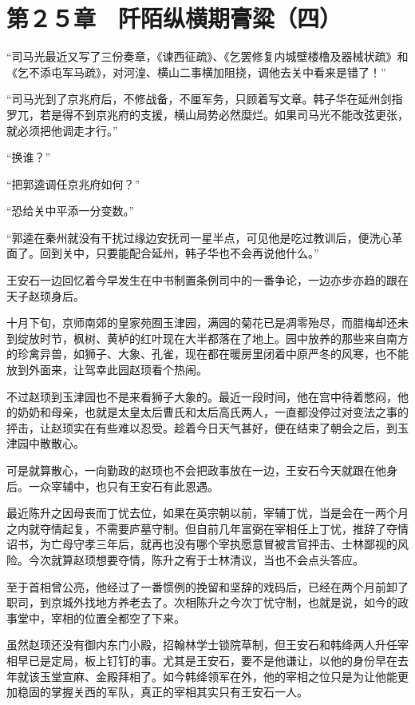 \section{第２５章　阡陌纵横期膏粱（四）}

“司马光最近又写了三份奏章，《谏西征疏》、《乞罢修复内城壁楼橹及器械状疏》和《乞不添屯军马疏》，对河湟、横山二事横加阻挠，调他去关中看来是错了！”

“司马光到了京兆府后，不修战备，不厘军务，只顾着写文章。韩子华在延州剑指罗兀，若是得不到京兆府的支援，横山局势必然糜烂。如果司马光不能改弦更张，就必须把他调走才行。”

“换谁？”

“把郭逵调任京兆府如何？”

“恐给关中平添一分变数。”

“郭逵在秦州就没有干扰过缘边安抚司一星半点，可见他是吃过教训后，便洗心革面了。回到关中，只要能配合延州，韩子华也不会再说他什么。”

王安石一边回忆着今早发生在中书制置条例司中的一番争论，一边亦步亦趋的跟在天子赵顼身后。

十月下旬，京师南郊的皇家苑囿玉津园，满园的菊花已是凋零殆尽，而腊梅却还未到绽放时节，枫树、黄栌的红叶现在大半都落在了地上。园中放养的那些来自南方的珍禽异兽，如狮子、大象、孔雀，现在都在暖房里闭着中原严冬的风寒，也不能放到外面来，让驾幸此园赵顼看个热闹。

不过赵顼到玉津园也不是来看狮子大象的。最近一段时间，他在宫中待着憋闷，他的奶奶和母亲，也就是太皇太后曹氏和太后高氏两人，一直都没停过对变法之事的抨击，让赵顼实在有些难以忍受。趁着今日天气甚好，便在结束了朝会之后，到玉津园中散散心。

可是就算散心，一向勤政的赵顼也不会把政事放在一边，王安石今天就跟在他身后。一众宰辅中，也只有王安石有此恩遇。

最近陈升之因母丧而丁忧去位，如果在英宗朝以前，宰辅丁忧，当是会在一两个月之内就夺情起复，不需要庐墓守制。但自前几年富弼在宰相任上丁忧，推辞了夺情诏书，为亡母守孝三年后，就再也没有哪个宰执愿意冒被言官抨击、士林鄙视的风险。今次就算赵顼想要夺情，陈升之宥于士林清议，当也不会点头答应。

至于首相曾公亮，他经过了一番惯例的挽留和坚辞的戏码后，已经在两个月前卸了职司，到京城外找地方养老去了。次相陈升之今次丁忧守制，也就是说，如今的政事堂中，宰相的位置全都空了下来。

虽然赵顼还没有御内东门小殿，招翰林学士锁院草制，但王安石和韩绛两人升任宰相早已是定局，板上钉钉的事。尤其是王安石，要不是他谦让，以他的身份早在去年就该玉堂宣麻、金殿拜相了。如今韩绛领军在外，他的宰相之位只是为让他能更加稳固的掌握关西的军队，真正的宰相其实只有王安石一人。

